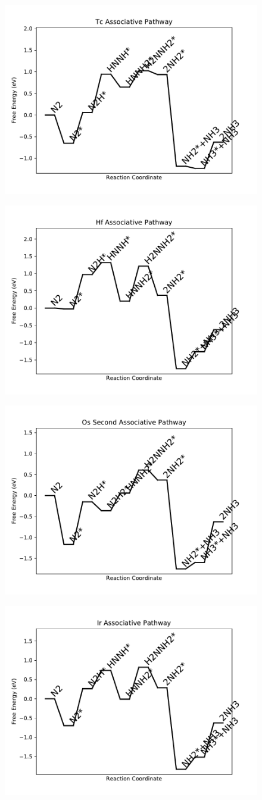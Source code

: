 \documentclass[journal=jacsat,manuscript=article]{achemso}
\begin{document}
\begin{figure}
\includegraphics[width=0.5\linewidth]{data/plots/Tc_associative.pdf}
\label{fig:Tc_associative}
\end{figure}

\newpage
\begin{figure}
\includegraphics[width=0.5\linewidth]{data/plots/Hf_associative.pdf}
\label{fig:Hf_associative}
\end{figure}

\begin{figure}
\includegraphics[width=0.5\linewidth]{data/plots/Os_associative_2.pdf}
\label{fig:Os_associative_2}
\end{figure}

\newpage
\begin{figure}
\includegraphics[width=0.5\linewidth]{data/plots/Ir_associative.pdf}
\label{fig:Ir_associative}
\end{figure}
\end{document}
